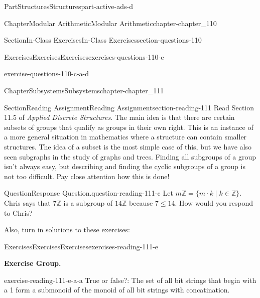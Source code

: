 \documentclass[oneside,10pt,]{book}
\numberwithin{equation}{section}
\begin{document}
\begin{partptx}{Part}{Structures}{}{Structures}{}{}{part-active-ads-d}
\begin{chapterptx}{Chapter}{Modular Arithmetic}{}{Modular Arithmetic}{}{}{chapter-chapter_110}
\begin{sectionptx}{Section}{In-Class Exercises}{}{In-Class Exercises}{}{}{section-questions-110}
\begin{exercises-subsection-numberless}{Exercises}{Exercises}{}{Exercises}{}{}{exercises-questions-110-c}
\begin{exercisegroup}
\begin{divisionexerciseeg}{4}{}{}{exercise-questions-110-c-a-d}
\end{divisionexerciseeg}%
\end{exercisegroup}
\par\medskip\noindent
\end{exercises-subsection-numberless}
\end{sectionptx}
\end{chapterptx}
%
\typeout{************************************************}
\typeout{************************************************}
%
\begin{chapterptx}{Chapter}{Subsystems}{}{Subsystems}{}{}{chapter-chapter_111}
\renewcommand*{\chaptername}{Chapter}
%
%
%
%
%
\typeout{************************************************}
\typeout{************************************************}
%
\begin{sectionptx}{Section}{Reading Assignment}{}{Reading Assignment}{}{}{section-reading-111}
Read Section 11.5 of \emph{Applied Discrete Structures}. The main idea is that there are certain subsets of groups that qualify as groups in their own right.  This is an instance of a more general situation in mathematics where a structure can contain smaller structures.  The idea of a subset is the most simple case of this, but we have also seen subgraphs in the study of graphs and trees.  Finding all subgroups of a group isn't always easy, but describing and finding the cyclic subgroups of a group is not too difficult.  Pay close attention how this is done!%
\begin{question}{Question}{Response Question.}{question-reading-111-c}%
Let \(m \mathbb{Z} = \{m \cdot k \mid k \in \mathbb{Z}\}\). Chris says that \(7 \mathbb{Z}\) is a subgroup of \(14 \mathbb{Z}\) because \(7 \leq 14\).   How would you respond to Chris?%
\end{question}
Also, turn in solutions to these exercises:%
%
%
\typeout{************************************************}
\typeout{************************************************}
%
\begin{exercises-subsection-numberless}{Exercises}{Exercises}{}{Exercises}{}{}{exercises-reading-111-e}
\par\medskip\noindent%
\textbf{Exercise Group.}\space\space%
\begin{exercisegroup}
\begin{divisionexerciseeg}{1}{}{}{exercise-reading-111-e-a-a}%
True or false?:  The set of all bit strings that begin with a 1 form a submonoid of the monoid of all bit strings with concatination.%

\end{divisionexerciseeg}
\end{exercisegroup}
\end{exercises-subsection-numberless}
\end{sectionptx}
\end{chapterptx}
\end{partptx}
\end{document}
